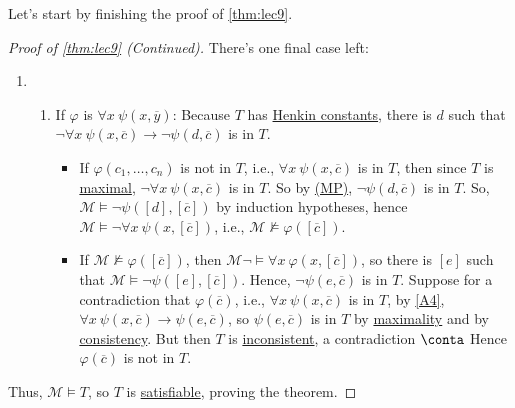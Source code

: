 Let's start by finishing the proof of \autoref{thm:lec9}.

\begin{proof}[Proof of \autoref{thm:lec9} (Continued)]
	There's one final case left:
	\begin{enumerate}
		\item[] \begin{enumerate}\setcounter{enumii}{\thestoppedhere}
				\item If \(\varphi \) is \(\forall x\ \psi (x, \overline{y} )\): Because \(T\) has \hyperref[def:Henkin-constant]{Henkin constants}, there is \(d\) such that \(\lnot \forall x\ \psi (x, \overline{c} ) \to \lnot \psi (d, \overline{c} )\) is in \(T\).
				      \begin{itemize}
					      \item If \(\varphi (c_1, \ldots , c_n)\) is not in \(T\), i.e., \(\forall x\ \psi (x, \overline{c} )\) is in \(T\), then since \(T\) is \hyperref[def:maximal]{maximal}, \(\lnot \forall x\ \psi (x, \overline{c} )\) is in \(T\). So by \hyperref[def:rule-of-inference]{(MP)}, \(\lnot \psi (d, \overline{c} )\) is in \(T\). So, \(\mathcal{M} \models \lnot \psi ([d], [\overline{c} ])\) by induction hypotheses, hence \(\mathcal{M} \models \lnot \forall x\ \psi (x, [\overline{c} ])\), i.e., \(\mathcal{M} \not \models \varphi ([\overline{c} ])\).
					      \item If \(\mathcal{M} \not \models \varphi ([\overline{c} ])\), then \(\mathcal{M} \lnot \models \forall x\ \varphi (x, [\overline{c} ])\), so there is \([e]\) such that \(\mathcal{M} \models \lnot \psi ([e], [\overline{c} ])\). Hence, \(\lnot \psi (e, \overline{c} )\) is in \(T\). Suppose for a contradiction that \(\varphi (\overline{c} )\), i.e., \(\forall x\ \psi (x, \overline{c} )\) is in \(T\), by \autoref{A4}, \(\forall x\ \psi (x, \overline{c} ) \to \psi (e, \overline{c} )\), so \(\psi (e, \overline{c} )\) is in \(T\) by \hyperref[def:maximal]{maximality} and by \hyperref[def:consistent]{consistency}. But then \(T\) is \hyperref[def:inconsistent]{inconsistent}, a contradiction \(\conta\) Hence \(\varphi (\overline{c} )\) is not in \(T\).
				      \end{itemize}
			\end{enumerate}
	\end{enumerate}
	Thus, \(\mathcal{M} \models T\), so \(T\) is \hyperref[def:satisfiable]{satisfiable}, proving the theorem.
\end{proof}

